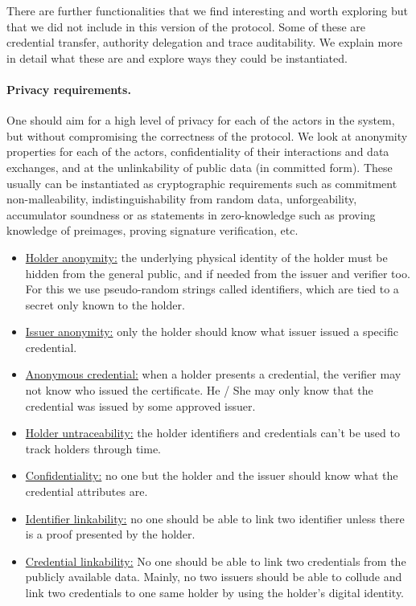 There are further functionalities that we find interesting and worth exploring but that we did not include in this version of the protocol. 
Some of these are credential transfer, authority delegation and trace auditability. We explain more in detail what these are and explore ways they could be instantiated. 


\paragraph{Privacy requirements.}
One should aim for a high level of privacy for each of the actors in the system, but without compromising the correctness of the protocol. We look at anonymity properties for each of the actors, confidentiality of their interactions and data exchanges, and at the unlinkability of public data (in committed form). These usually can be instantiated as cryptographic requirements such as commitment non-malleability, indistinguishability from random data, unforgeability, accumulator soundness or as statements in zero-knowledge such as proving knowledge of preimages, proving signature verification, etc.

\begin{itemize}
		\item \underline{Holder anonymity:} the underlying physical identity of the holder must be hidden from the general public, and if needed from the issuer and verifier too. For this we use pseudo-random strings called identifiers, which are tied to a secret only known to the holder. 
		\item \underline{Issuer anonymity:} only the holder should know what issuer issued a specific credential.
		\item \underline{Anonymous credential:} when a holder presents a credential, the verifier may not know who issued the certificate. He / She may only know that the credential was issued by some approved issuer.
		\item \underline{Holder untraceability:} the holder identifiers and credentials can’t be used to track holders through time.
		\item \underline{Confidentiality:} no one but the holder and the issuer should know what the credential attributes are.
		\item \underline{Identifier linkability:} no one should be able to link two identifier unless there is a proof presented by the holder.
		\item \underline{Credential linkability:} No one should be able to link two credentials from the publicly available data. Mainly, no two issuers should be able to collude and link two credentials to one same holder by using the holder’s digital identity.
\end{itemize}



